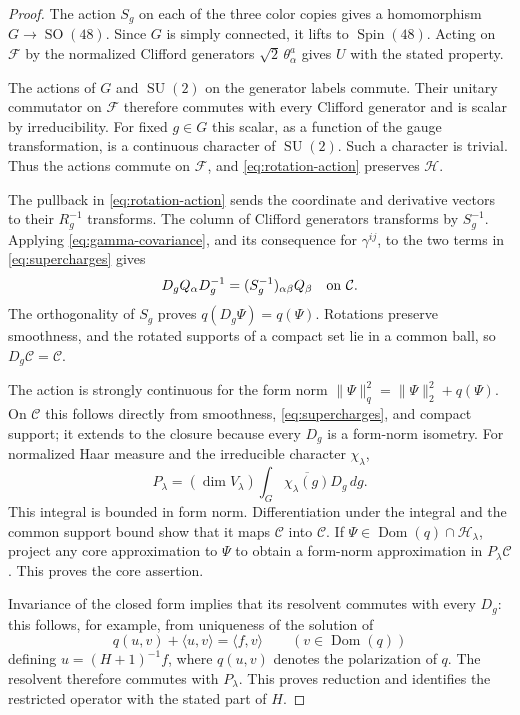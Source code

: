 \documentclass[11pt]{amsart}
\newcommand{\F}{\mathcal F}
\newcommand{\Core}{\mathcal C}
\newcommand{\Hphys}{\mathcal H}
\newcommand{\Spin}{\operatorname{Spin}}
\newcommand{\SU}{\operatorname{SU}}
\newcommand{\SO}{\operatorname{SO}}
\newcommand{\Dom}{\operatorname{Dom}}
\newcommand{\norm}[1]{\lVert #1\rVert}
\newcommand{\ip}[2]{\langle #1,#2\rangle}
\theoremstyle{remark}
\numberwithin{equation}{section}
\begin{document}
\begin{proof}
The action $S_g$ on each of the three color copies gives a homomorphism
$G\to\SO(48)$. Since $G$ is simply connected, it lifts to
$\Spin(48)$. Acting on $\F$ by the normalized Clifford generators
$\sqrt2\,\theta_\alpha^a$ gives $U$ with the stated property.

The actions of $G$ and $\SU(2)$ on the generator labels commute.
Their unitary commutator on $\F$ therefore commutes with every Clifford
generator and is scalar by irreducibility. For fixed $g\in G$ this
scalar, as a function of the gauge transformation, is a continuous
character of $\SU(2)$. Such a character is trivial. Thus the actions
commute on $\F$, and \eqref{eq:rotation-action} preserves $\Hphys$.

The pullback in \eqref{eq:rotation-action} sends the coordinate and
derivative vectors to their $R_g^{-1}$ transforms. The column of
Clifford generators transforms by $S_g^{-1}$. Applying
\eqref{eq:gamma-covariance}, and its consequence for $\gamma^{ij}$,
to the two terms in \eqref{eq:supercharges} gives
\[
 D_g Q_\alpha D_g^{-1}
   =(S_g^{-1})_{\alpha\beta}Q_\beta
 \quad\hbox{on }\Core.
\]
The orthogonality of $S_g$ proves $q(D_g\Psi)=q(\Psi)$.
Rotations preserve smoothness, and the rotated supports of a compact
set lie in a common ball, so $D_g\Core=\Core$.

The action is strongly continuous for the form norm
$\norm{\Psi}_q^2=\norm{\Psi}_2^2+q(\Psi)$. On $\Core$ this follows
directly from smoothness, \eqref{eq:supercharges}, and compact support;
it extends to the closure because every $D_g$ is a form-norm isometry.
For normalized Haar measure and the irreducible character $\chi_\lambda$,
\[
 P_\lambda
   =(\dim V_\lambda)\int_G\overline{\chi_\lambda(g)}D_g\,dg.
\]
This integral is bounded in form norm. Differentiation under the
integral and the common support bound show that it maps $\Core$ into
$\Core$. If $\Psi\in\Dom(q)\cap\Hphys_\lambda$, project any core
approximation to $\Psi$ to obtain a form-norm approximation in
$P_\lambda\Core$. This proves the core assertion.

Invariance of the closed form implies that its resolvent commutes with
every $D_g$: this follows, for example, from uniqueness of the solution
of
\[
 q(u,v)+\ip{u}{v}=\ip{f}{v}\qquad(v\in\Dom(q))
\]
defining $u=(H+1)^{-1}f$, where $q(u,v)$ denotes the polarization of
$q$. The resolvent therefore commutes with
$P_\lambda$. This proves reduction and identifies the restricted
operator with the stated part of $H$.
\end{proof}
\end{document}

